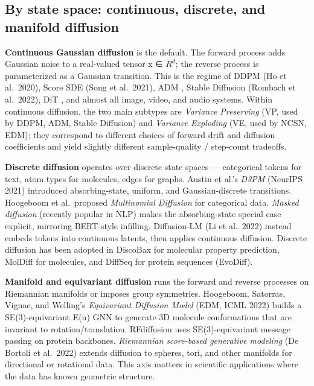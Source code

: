 \documentclass{article}
\begin{document}
\subsection{By state space: continuous, discrete, and manifold diffusion}\label{by-state-space-continuous-discrete-and-manifold-diffusion}

\textbf{Continuous Gaussian diffusion} is the default. The forward process adds Gaussian noise to a real-valued tensor x ∈ \(R^d\); the reverse process is parameterized as a Gaussian transition. This is the regime of DDPM (Ho et al.~2020), Score SDE (Song et al.~2021), ADM \citep{dhariwal2021diffusionmodelsbea}, Stable Diffusion (Rombach et al.~2022), DiT \citep{peebles2023scalablediffusionm}, and almost all image, video, and audio systems. Within continuous diffusion, the two main subtypes are \emph{Variance Preserving} (VP, used by DDPM, ADM, Stable Diffusion) and \emph{Variance Exploding} (VE, used by NCSN, EDM); they correspond to different choices of forward drift and diffusion coefficients and yield slightly different sample-quality / step-count tradeoffs.

\textbf{Discrete diffusion} operates over discrete state spaces --- categorical tokens for text, atom types for molecules, edges for graphs. Austin et al.'s \emph{D3PM} (NeurIPS 2021) introduced absorbing-state, uniform, and Gaussian-discrete transitions. Hoogeboom et al.~proposed \emph{Multinomial Diffusion} for categorical data. \emph{Masked diffusion} (recently popular in NLP) makes the absorbing-state special case explicit, mirroring BERT-style infilling. Diffusion-LM (Li et al.~2022) instead embeds tokens into continuous latents, then applies continuous diffusion. Discrete diffusion has been adopted in DiscoBax for molecular property prediction, MolDiff for molecules, and DiffSeq for protein sequences (EvoDiff).

\textbf{Manifold and equivariant diffusion} runs the forward and reverse processes on Riemannian manifolds or imposes group symmetries. Hoogeboom, Satorras, Vignac, and Welling's \emph{Equivariant Diffusion Model} (EDM, ICML 2022) builds a SE(3)-equivariant E(n) GNN to generate 3D molecule conformations that are invariant to rotation/translation. RFdiffusion uses SE(3)-equivariant message passing on protein backbones. \emph{Riemannian score-based generative modeling} (De Bortoli et al.~2022) extends diffusion to spheres, tori, and other manifolds for directional or rotational data. This axis matters in scientific applications where the data has known geometric structure.
\end{document}
